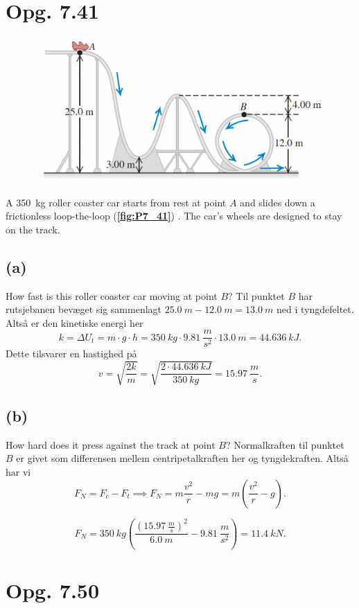 \documentclass[12pt]{article}
\begin{document}
  

\section*{Opg. 7.41}

\begin{figure} [ht]
  \centering
  \caption{}
  \includegraphics[width=0.5\linewidth]{../figures/P7_41.png}
  \label{fig:P7_41}
\end{figure}

A \qty{350}{kg} roller coaster car starts from rest at point $A$ and slides down a frictionless loop-the-loop (\textbf{\autoref{fig:P7_41}}) . The car’s wheels are designed to stay on the track.

\subsection*{(a)}
How fast is this roller coaster car moving at point $B$?
\bigbreak
Til punktet $B$ har rutsjebanen bevæget sig sammenlagt $\qty{25,0}{m} - \qty{12,0}{m} = \qty{13,0}{m}$ ned i tyngdefeltet. Altså er den kinetiske energi her
\[
k = \Delta U_t = m\cdot g\cdot h = \qty{350}{kg}\cdot \qty{9,81}{\frac{m}{s^2}}\cdot \qty{13,0}{m} = \qty{44,636}{kJ}
.\] 
Dette tilsvarer en hastighed på
\[
v = \sqrt{\frac{2k}{m}} = \sqrt{\frac{2\cdot \qty{44,636}{kJ}}{\qty{350}{kg}}} = \qty{15,97}{\frac{m}{s}}
.\] 

\subsection*{(b)}
How hard does it press against the track at point $B$?
\bigbreak
Normalkraften til punktet $B$ er givet som differensen mellem centripetalkraften her og tyngdekraften. Altså har vi
 \[
F_N = F_c - F_t \implies F_N = m \frac{v^2}{r} - mg = m\left(\frac{v^2}{r}-g\right) .\] 

\[
  F_N = \qty{350}{kg}\left( \frac{\left( \qty{15,97}{\frac{m}{s}} \right)^2 }{\qty{6,0}{m}} - \qty{9,81}{\frac{m}{s^2}} \right) = \qty{11,4}{kN} 
.\] 

\section*{Opg. 7.50}
\end{document}
